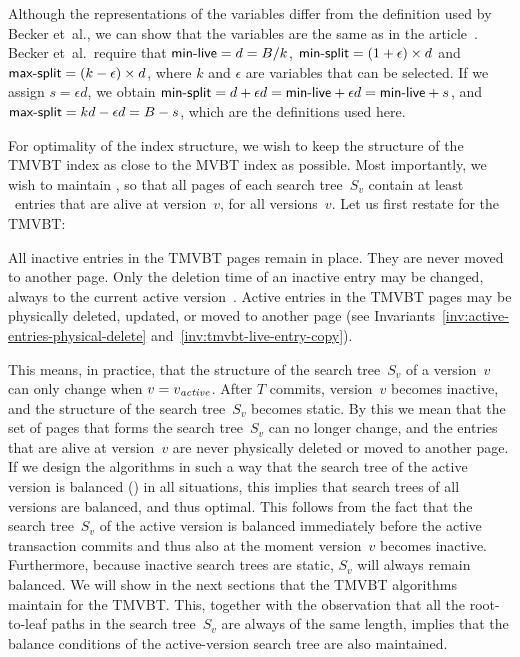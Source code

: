 Although the representations of the variables differ from the
definition used by Becker et~al., we can show that the variables are the
same as in the  article~\cite{becker:1996:mvbt}. 
Becker et~al.\ require that $\text{\textsf{min-live}} = d = B/k$, $\text{\textsf{min-split}} =
(1 + \epsilon) \times d$ and $\text{\textsf{max-split}} = (k - \epsilon) \times d$, where
$k$ and $\epsilon$ are variables that can be selected.
If we assign $s = \epsilon d$, we obtain $\text{\textsf{min-split}} = d + \epsilon d =
\text{\textsf{min-live}} + \epsilon d = \text{\textsf{min-live}} + s$, and $\text{\textsf{max-split}} = k d - \epsilon
d = B - s$, which are the definitions used here.

For optimality of the index structure, we wish to keep the structure of
the TMVBT index as close to the MVBT index as possible.
Most importantly, we wish to maintain , so that
all pages of each search tree~$S_v$ contain at least \minlive\ entries that
are alive at version~$v$, for all versions~$v$.
Let us first restate  for the TMVBT:

\thmskip
\begin{invariant}
\label{inv:tmvbt-static-inactive-entries}
All inactive entries in the TMVBT pages remain in place. 
They are never moved to another page.
Only the deletion time of an inactive entry may be changed, always to the
current active version~\actver.
Active entries in the TMVBT pages may be physically deleted,
updated, or moved to another page (see
Invariants~\ref{inv:active-entries-physical-delete}
and~\ref{inv:tmvbt-live-entry-copy}).
\end{invariant}
\thmskip

This means, in practice, that the structure of the search tree~$S_v$ of a
version~$v$ can only change when $v = \smash{v_{\text{\textit{active}}}}$.
After $T$ commits, version~$v$ becomes inactive, and the structure of
the search tree~$S_v$ becomes static.
By this we mean that the set of pages that forms the search tree~$S_v$ can
no longer change, and the entries that are alive at version~$v$ are 
never physically deleted or moved to another page. 
If we design the algorithms in such a way that the search tree of the active
version is balanced () in all situations,
this implies that search trees of all versions are balanced, and thus
optimal.
This follows from the fact that the search tree~$S_v$ of the active
version is balanced immediately before the active transaction commits and thus
also at the moment version~$v$ becomes inactive. 
Furthermore, because inactive search trees are static, $S_v$ will always remain
balanced. 
We will show in the next sections that the TMVBT algorithms maintain 
 for the TMVBT\@.
This, together with the observation that all the root-to-leaf paths in the
search tree~$S_v$ are always of the same length, implies that the balance
conditions of the active-version search tree are also maintained.


